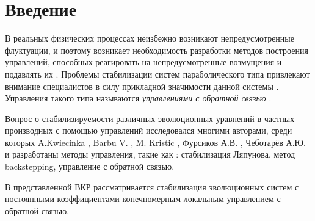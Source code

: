 \section*{Введение}
\vspace{1em}

В реальных физических процессах неизбежно возникают непредусмотренные 
флуктуации, и поэтому возникает необходимость разработки методов построения 
управлений, способных реагировать на непредусмотренные возмущения и подавлять 
их \cite{Furs}. Проблемы стабилизации систем параболического типа привлекают внимание 
специалистов в силу прикладной значимости данной системы \cite{Chebotarev}. 
Управления такого типа называются \emph{управлениями с обратной связью} \cite{KS}.

Вопрос о стабилизируемости различных эволюционных уравнений в частных 
производных с помощью управлений исследовался многими авторами, среди которых 
A.Kwiecinka \cite{KWCK}, Barbu V. \cite{Barbu}, M. Kristic
\cite{KMV, KS}, Фурсиков А.В. \cite{Furs}, Чеботарёв А.Ю. 
\cite{Chebotarev, ChebotarevBS, ChebotarevMGT} и разработаны методы управления, 
такие как : стабилизация Ляпунова, метод backstepping, управление с обратной связью.

В представленной ВКР рассматривается стабилизация эволюционных систем с 
постоянными коэффициентами конечномерным локальным управлением с обратной связью.
